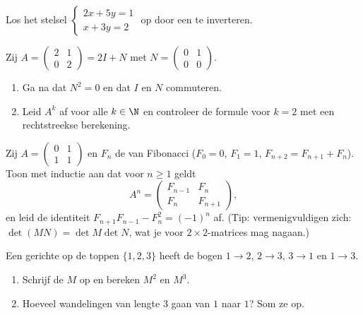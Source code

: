 \begin{exercise}[$\star$]\label{exo:g12:matrix:3}
Los het stelsel $\begin{cases} 2x + 5y = 1\\ x + 3y = 2 \end{cases}$ op door
een  te inverteren.
\end{exercise}

\begin{exercise}[$\star\star$]\label{exo:g12:matrix:4}
Zij $A = \begin{pmatrix} 2 & 1\\ 0 & 2\end{pmatrix} = 2I + N$ met
$N = \begin{pmatrix} 0 & 1\\ 0 & 0 \end{pmatrix}$.
\begin{enumerate}
  \item Ga na dat $N^2 = 0$ en dat $I$ en $N$ commuteren.
  \item Leid $A^k$ af voor alle $k \in \N$ en controleer de formule voor
        $k=2$ met een rechtstreekse berekening.
\end{enumerate}
\end{exercise}

\begin{exercise}[$\star\star$]\label{exo:g12:matrix:5}
Zij $A = \begin{pmatrix} 0 & 1\\ 1 & 1\end{pmatrix}$ en $F_n$ de  van
Fibonacci ($F_0 = 0$, $F_1 = 1$, $F_{n+2} = F_{n+1} + F_n$). Toon met inductie
aan dat voor $n \geq 1$ geldt
\[
A^n = \begin{pmatrix} F_{n-1} & F_n\\ F_n & F_{n+1}\end{pmatrix},
\]
en leid de identiteit $F_{n+1}F_{n-1} - F_n^2 = (-1)^n$ af.
(Tip:  vermenigvuldigen zich: $\det(MN) = \det M \det N$, wat je
voor $2\times2$-matrices mag nagaan.)
\end{exercise}

\begin{exercise}[$\star\star$]\label{exo:g12:matrix:6}
Een gerichte  op de toppen $\{1, 2, 3\}$ heeft de bogen
$1\to2$, $2\to3$, $3\to1$ en $1\to3$.
\begin{enumerate}
  \item Schrijf de  $M$ op en bereken $M^2$ en $M^3$.
  \item Hoeveel wandelingen van lengte $3$ gaan van $1$ naar $1$? Som ze op.
\end{enumerate}
\end{exercise}

